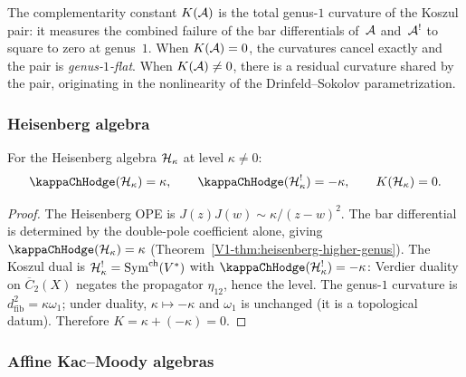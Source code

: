 \begin{remark}
The complementarity constant $K(\mathcal{A})$ is the total genus-$1$
curvature of the Koszul pair: it measures the combined failure of the
bar differentials of~$\mathcal{A}$ and~$\mathcal{A}^!$ to square to zero at
genus~$1$. When $K(\mathcal{A}) = 0$, the curvatures cancel exactly and the
pair is \emph{genus-$1$-flat}. When $K(\mathcal{A}) \neq 0$, there is a
residual curvature shared by the pair, originating in the nonlinearity
of the Drinfeld--Sokolov parametrization.
\end{remark}

\subsubsection{Heisenberg algebra}

\begin{proposition}
For the Heisenberg algebra $\mathcal{H}_\kappa$ at level $\kappa \neq 0$:
\begin{equation}%
\kappaChHodge(\cH_\kappa) = \kappa,
\qquad
\kappaChHodge(\cH_\kappa^!) = -\kappa,
\qquad
K(\cH_\kappa) = 0.
\end{equation}
\end{proposition}

\begin{proof}
The Heisenberg OPE is $J(z) J(w) \sim \kappa/(z-w)^2$. The bar
differential is determined by the double-pole coefficient alone,
giving $\kappaChHodge(\cH_\kappa) = \kappa$
(Theorem~\ref{V1-thm:heisenberg-higher-genus}).
The Koszul dual is $\mathcal{H}_\kappa^! = \mathrm{Sym}^{\mathrm{ch}}(V^*)$
with $\kappaChHodge(\cH_\kappa^!) = -\kappa$: Verdier duality
on $\overline{C}_2(X)$ negates the propagator $\eta_{12}$, hence
the level. The genus-$1$ curvature is $d_{\mathrm{fib}}^2 = \kappa \omega_1$;
under duality, $\kappa \mapsto -\kappa$ and $\omega_1$ is unchanged
(it is a topological datum). Therefore $K = \kappa + (-\kappa) = 0$.
\end{proof}

\subsubsection{Affine Kac--Moody algebras}

